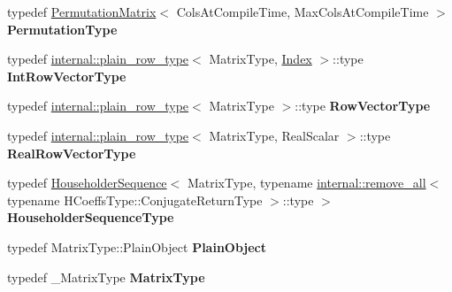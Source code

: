 \begin{DoxyCompactItemize}
\item 
\mbox{\label{group___q_r___module_a04a1ec15296f9c62857e98e7699fe2a9}} 
typedef \hyperlink{group___core___module_class_eigen_1_1_permutation_matrix}{Permutation\+Matrix}$<$ Cols\+At\+Compile\+Time, Max\+Cols\+At\+Compile\+Time $>$ {\bfseries Permutation\+Type}
\item 
\mbox{\label{group___q_r___module_a6a936341a807b4c526edeae544ed3c50}} 
typedef \hyperlink{struct_eigen_1_1internal_1_1plain__row__type}{internal\+::plain\+\_\+row\+\_\+type}$<$ Matrix\+Type, \hyperlink{namespace_eigen_a62e77e0933482dafde8fe197d9a2cfde}{Index} $>$\+::type {\bfseries Int\+Row\+Vector\+Type}
\item 
\mbox{\label{group___q_r___module_ad2e5d38156d09b36f4c57b7746092ad1}} 
typedef \hyperlink{struct_eigen_1_1internal_1_1plain__row__type}{internal\+::plain\+\_\+row\+\_\+type}$<$ Matrix\+Type $>$\+::type {\bfseries Row\+Vector\+Type}
\item 
\mbox{\label{group___q_r___module_afb69477038a2efe1a09072fa46030be9}} 
typedef \hyperlink{struct_eigen_1_1internal_1_1plain__row__type}{internal\+::plain\+\_\+row\+\_\+type}$<$ Matrix\+Type, Real\+Scalar $>$\+::type {\bfseries Real\+Row\+Vector\+Type}
\item 
\mbox{\label{group___q_r___module_a55b37f691cf7c54edd525b551eefe566}} 
typedef \hyperlink{group___householder___module_class_eigen_1_1_householder_sequence}{Householder\+Sequence}$<$ Matrix\+Type, typename \hyperlink{struct_eigen_1_1internal_1_1remove__all}{internal\+::remove\+\_\+all}$<$ typename H\+Coeffs\+Type\+::\+Conjugate\+Return\+Type $>$\+::type $>$ {\bfseries Householder\+Sequence\+Type}
\item 
\mbox{\label{group___q_r___module_aa3945dfd3f2109bd7f26a4acefe9f769}} 
typedef Matrix\+Type\+::\+Plain\+Object {\bfseries Plain\+Object}
\item 
\mbox{\label{group___q_r___module_a8276f0f98a2d82532146ae8b5967f6e9}} 
typedef \+\_\+\+Matrix\+Type {\bfseries Matrix\+Type}
\item 
\mbox{\label{group___q_r___module_a7a1da52a50e75161a8ea7b3f72934129}} 

\end{DoxyCompactItemize}
